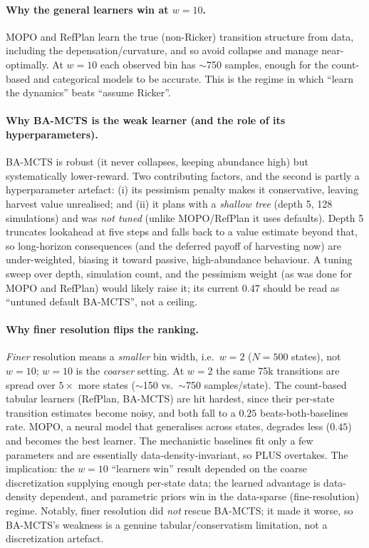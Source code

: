 \documentclass[11pt]{article}
\begin{document}
\paragraph{Why the general learners win at $w=10$.} MOPO and RefPlan learn the true
(non-Ricker) transition structure from data, including the depensation/curvature, and so
avoid collapse and manage near-optimally. At $w=10$ each observed bin has $\sim$750
samples, enough for the count-based and categorical models to be accurate. This is the
regime in which ``learn the dynamics'' beats ``assume Ricker''.

\paragraph{Why BA-MCTS is the weak learner (and the role of its hyperparameters).}
BA-MCTS is robust (it never collapses, keeping abundance high) but systematically
lower-reward. Two contributing factors, and the second is partly a hyperparameter
artefact: (i) its pessimism penalty makes it conservative, leaving harvest value
unrealised; and (ii) it plans with a \emph{shallow tree} (depth 5, 128 simulations) and
was \emph{not tuned} (unlike MOPO/RefPlan it uses defaults). Depth 5 truncates lookahead
at five steps and falls back to a value estimate beyond that, so long-horizon
consequences (and the deferred payoff of harvesting now) are under-weighted, biasing it
toward passive, high-abundance behaviour. A tuning sweep over depth, simulation count, and
the pessimism weight (as was done for MOPO and RefPlan) would likely raise it; its current
$0.47$ should be read as ``untuned default BA-MCTS'', not a ceiling.

\paragraph{Why finer resolution flips the ranking.} \emph{Finer} resolution means a
\emph{smaller} bin width, i.e.\ $w=2$ ($N=500$ states), not $w=10$; $w=10$ is the
\emph{coarser} setting. At $w=2$ the same 75k transitions are spread over $5\times$ more
states ($\sim$150 vs.\ $\sim$750 samples/state). The count-based tabular learners (RefPlan,
BA-MCTS) are hit hardest, since their per-state transition estimates become noisy, and both
fall to a $0.25$ beats-both-baselines rate. MOPO, a neural model that generalises across
states, degrades less ($0.45$) and becomes the best learner. The mechanistic baselines fit
only a few parameters and are essentially data-density-invariant, so PLUS overtakes. The
implication: the $w=10$ ``learners win'' result depended on the coarse discretization
supplying enough per-state data; the learned advantage is data-density dependent, and
parametric priors win in the data-sparse (fine-resolution) regime. Notably, finer
resolution did \emph{not} rescue BA-MCTS; it made it worse, so BA-MCTS's weakness is a
genuine tabular/conservatism limitation, not a discretization artefact.
\end{document}
